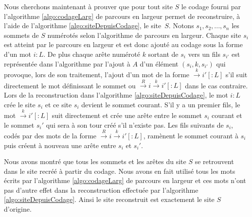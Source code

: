 \begin{pr}
Nous cherchons maintenant à prouver que pour tout site $S$ le codage fourni par l'algorithme \ref{algo:codageLarg} de parcours en largeur permet de reconstruire, à l'aide de l'algorithme \ref{algo:siteDepuisCodage}, le site~$S$.
Notons $s_1, s_2, ..., s_n$ les sommets de $S$ numérotés selon l'algorithme de parcours en largeur. 
Chaque site $s_i$ est atteint par le parcours en largeur et est donc ajouté au codage sous la forme d'un mot $i:L$. 
De plus chaque arête numéroté $k$ sortant de $s_i$ vers un fils $s_{i'}$ est représentée dans l'algorithme par l'ajout à $A$ d'un élément $(s_i, k, s_{i'})$ qui provoque, lors de son traitement, l'ajout d'un mot de la forme $\xrightarrow{k}i'[:L]$ s'il suit directement le mot définissant le sommet ou $\xrightarrow{R}i\xrightarrow{k}i'[:L]$ dans le cas contraire.
Lors de la reconstruction dans l'algorithme \ref{algo:siteDepuisCodage}, le mot $i:L$ crée le site $s_i$ et ce site $s_i$ devient le sommet courant. S'il y a un premier fils, le mot $\xrightarrow{k}i'[:L]$ suit directement et crée une arête entre le sommet $s_i$
courant et le sommet $s_i'$ qui sera à son tour créé s'il n'existe pas. Les fils suivants de $s_i$, codés par des mots de la forme $\xrightarrow{R}i\xrightarrow{k}i'[:L]$, ramènent le sommet courant à $s_i$ puis créent à nouveau une arête entre $s_i$ et $s_i'$.

Nous avons montré que tous les sommets et les arêtes du site $S$ se retrouvent dans le site recréé à partir du codage.
Nous avons en fait utilisé tous les mots écrits par l'algorithme \ref{algo:codageLarg} de parcours en largeur et ces mots n'ont pas d'autre effet dans la reconstruction effectuée par l'algorithme \ref{algo:siteDepuisCodage}.
Ainsi le site reconstruit est exactement le site $S$ d'origine. 
\end{pr}


% 
% 
% 

